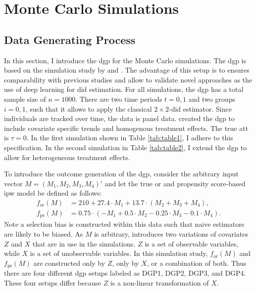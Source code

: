 \section{Monte Carlo Simulations}


\subsection{Data Generating Process}

In this section, I introduce the \ac{dgp} for the Monte Carlo simulations.
The \ac{dgp} is based on the simulation study by \citet{kang2007demystifying} and \citet{santannaDoublyRobustDifferenceindifferences2020}.
The advantage of this setup is to ensures comparability with previous studies and allow to validate novel approaches as the use of deep learning for \ac{did} estimation.
For all simulations, the \ac{dgp} has a total sample size of $n=1000$.
There are two time periods $t=0,1$ and two groups $i=0,1$, such that it allows to apply the classical $2\times2$-\ac{did} estimator.
Since individuals are tracked over time, the data is panel data.
\citet{kang2007demystifying} created the \ac{dgp} to include covariate specific trends and homogenous treatment effects.
The true \ac{att} is $\tau = 0$.
In the first simulation shown in Table \ref{tab:table1}, I adhere to this specification. In the second simulation in Table \ref{tab:table2}, I extend the \ac{dgp} to allow for heterogeneous treatment effects.

To introduce the outcome generation of the \ac{dgp}, consider the arbitrary input vector $M = (M_1, M_2, M_3, M_4)'$ and let the true \ac{or} and propensity score-based \ac{ipw} model be defined as follows:
\begin{align}
    f_{\text{or}}(M) &= 210 + 27.4 \cdot M_1 + 13.7 \cdot (M_2 + M_3 + M_4), \\
    f_{\text{ps}}(M) &= 0.75 \cdot (-M_1 + 0.5 \cdot M_2 - 0.25 \cdot M_3 - 0.1 \cdot M_4).
\end{align}
Note a selection bias is constructed within this data \citep{kang2007demystifying} such that naive estimators are likely to be biased.
As $M$ is arbitrary, \citet{kang2007demystifying} introduces two variations of covariates $Z$ and $X$ that are in use in the simulations.
$Z$ is a set of observable variables, while $X$ is a set of unobservable variables.
In this simulation study, $f_{\text{or}}(M)$ and $f_{\text{ps}}(M)$ are constructed only by $Z$, only by $X$, or a combination of both.
Thus there are four different \ac{dgp} setups labeled as DGP1, DGP2, DGP3, and DGP4.
These four setups differ because $Z$ is a non-linear transformation of $X$.

